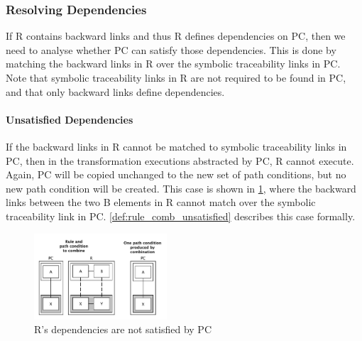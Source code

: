 


\subsubsection{Resolving Dependencies}
\label{subsubsec:resolve_dependencies}
If R contains backward links and thus R defines dependencies on PC, then we need to analyse whether PC can satisfy those dependencies. This is done by matching the backward links in R over the symbolic traceability links in PC. Note that symbolic traceability links in R are not required to be found in PC, and that only backward links define dependencies.

\paragraph{Unsatisfied Dependencies}


If the backward links in R cannot be matched to symbolic traceability links in PC, then in the transformation executions abstracted by PC, R cannot execute. Again, PC will be copied unchanged to the new set of path conditions, but no new path condition will be created. This case is shown in \cref{fig:non_satisfied_dependencies}, where the backward links between the two B elements in R cannot match over the symbolic traceability link in PC. \cref{def:rule_comb_unsatisfied} describes this case formally.

\begin{figure}[h!] \centering \includegraphics[width=0.44\textwidth]{./figures/building_path_conditions/non_satisfied_dependencies.pdf}
	\caption{R's dependencies are not satisfied by PC}
	\label{fig:non_satisfied_dependencies}
\end{figure}

